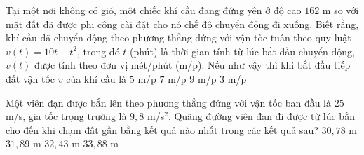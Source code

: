 \begin{ex}%
	Tại một nơi không có gió, một chiếc khí cầu đang đứng yên ở độ cao $162$ m so với mặt đất đã được phi công cài đặt cho nó chế độ chuyển động đi xuống. Biết rằng, khí cầu đã chuyển động theo phương thẳng đứng với vận tốc tuân theo quy luật $v(t)=10t-t^2$, trong đó $t$ (phút) là thời gian tính từ lúc bắt đầu chuyển động, $v(t)$ được tính theo đơn vị mét/phút (m/p). Nếu như vậy thì khi bắt đầu tiếp đất vận tốc $v$ của khí cầu là
	\choice
	{$5$ m/p}
	{$7$ m/p}
	{\True $9$ m/p}
	{$3$ m/p}
\end{ex}

\begin{ex}%
	Một viên đạn được bắn lên theo phương thẳng đứng với vận tốc ban đầu là $25$ m/s, gia tốc trọng trường là $9{,}8$ m/s$^2$. Quãng đường viên đạn đi được từ lúc bắn cho đến khi chạm đất gần bằng kết quả nào nhất trong các kết quả sau?
	\choice
	{$30{,}78$ m}
	{\True $31{,}89$ m}
	{$32{,}43$ m}
	{$33{,}88$ m}
\end{ex}

